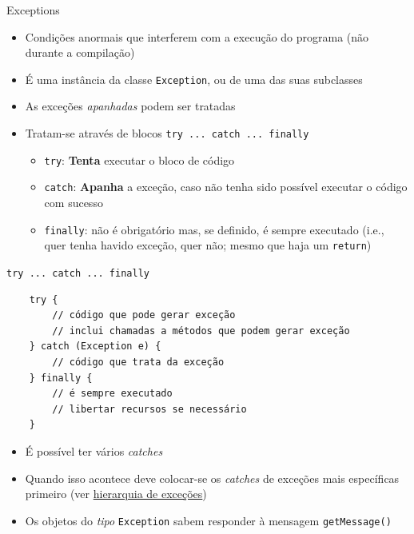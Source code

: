 \documentclass[portuguese, aspectratio=169, xcolor=table]{beamer}
\begin{document}
\begin{frame}{Exceptions}
\begin{itemize}
    \item Condições anormais que interferem com a execução do programa (não durante a compilação)
    \item É uma instância da classe \texttt{Exception}, ou de uma das suas subclasses
    \item As exceções \textit{apanhadas} podem ser tratadas
    \item Tratam-se através de blocos \texttt{try ... catch ... finally}
    \begin{itemize}
        \item \texttt{try}: \textbf{Tenta} executar o bloco de código
        \item \texttt{catch}: \textbf{Apanha} a exceção, caso não tenha sido possível executar o código com sucesso
        \item \texttt{finally}: não é obrigatório mas, se definido, é sempre executado (i.e., quer tenha havido exceção, quer não; mesmo que haja um \texttt{return})
    \end{itemize}
\end{itemize}
\end{frame}


\begin{frame}[fragile]{\texttt{try ... catch ... finally}}
\begin{verbatim}
    try {
        // código que pode gerar exceção
        // inclui chamadas a métodos que podem gerar exceção
    } catch (Exception e) {
        // código que trata da exceção
    } finally {
        // é sempre executado
        // libertar recursos se necessário
    }
\end{verbatim}

\begin{itemize}
    \item É possível ter vários \textit{catches}
    \item Quando isso acontece deve colocar-se os \textit{catches} de exceções mais específicas primeiro (ver \href{https://www.java4us.com/wp-content/uploads/2018/06/exception_hierarachy_diagram.png}{hierarquia de exceções})
    \item Os objetos do \textit{tipo} \texttt{Exception} sabem responder à mensagem \texttt{getMessage()}
\end{itemize}
\end{frame}
\end{document}
